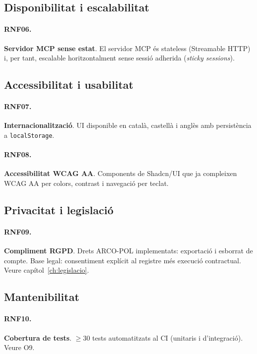 \subsection{Disponibilitat i escalabilitat}

\paragraph{RNF06.} \textbf{Servidor MCP sense estat}. El servidor MCP
és stateless (Streamable HTTP) i, per tant, escalable horitzontalment
sense sessió adherida (\emph{sticky sessions}).

\subsection{Accessibilitat i usabilitat}

\paragraph{RNF07.} \textbf{Internacionalització}. UI disponible en
català, castellà i anglès amb persistència a \texttt{localStorage}.

\paragraph{RNF08.} \textbf{Accessibilitat WCAG AA}. Components de
Shadcn/UI que ja compleixen WCAG AA per colors, contrast i navegació
per teclat.

\subsection{Privacitat i legislació}

\paragraph{RNF09.} \textbf{Compliment RGPD}. Drets ARCO-POL
implementats: exportació i esborrat de compte. Base legal: consentiment
explícit al registre més execució contractual. Veure
capítol~\ref{ch:legislacio}.

\subsection{Mantenibilitat}

\paragraph{RNF10.} \textbf{Cobertura de tests}. $\geq 30$ tests
automatitzats al CI (unitaris i d'integració). Veure O9.

